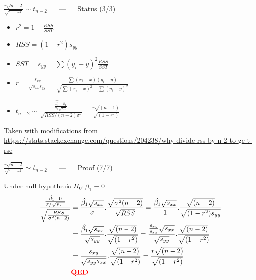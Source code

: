 \documentclass{beamer}
\begin{document}
\begin{frame}
{\centerline{$  \frac{r\sqrt{n-2}}{\sqrt{1-r^2}} \sim t_{n-2}  $  ~~ --- ~~ Status (3/3)}}

\begin{itemize}
\setlength\itemsep{0.8em}
\item $r^2 = 1 - \frac{RSS}{SST}$
\item $RSS = (1 - r^2)s_{yy} $
\item $SST = s_{yy} = \sum ( y_i - \bar{y} )^2 \frac{RSS}{SST}$
\item $r = \frac{s_{xy}}{\sqrt{s_{xx}s_{yy}}} = \frac{\sum (x_i - \bar{x})(y_i - \bar{y})}{\sqrt{\sum (x_i - \bar{x})^2 + \sum (y_i - \bar{y})^2}}$
\item $t_{n-2} \sim \frac{\frac{\hat{\beta_1} - \beta_1}{\sigma / \sqrt{s_{xx}}}}{\sqrt{RSS / (n-2)\sigma^2}} = \frac{r\sqrt{(n-1)}}{\sqrt{(1 - r^2)}}$
\end{itemize}


\begin{center}
\tiny{Taken with modifications from \url{https://stats.stackexchange.com/questions/204238/why-divide-rss-by-n-2-to-ge t-rse}}
\end{center}
\end{frame}


\begin{frame}
{\centerline{$  \frac{r\sqrt{n-2}}{\sqrt{1-r^2}} \sim t_{n-2}  $  ~~ --- ~~ Proof (7/7)}}

Under null hypothesis $H_0 : \beta_1 = 0$
\begin{align*}\
\frac{\frac{\hat{\beta_1} - 0}{\sigma / \sqrt{s_{xx}}}}{\sqrt{\frac{RSS}{\sigma^2 (n - 2)}}} &= \frac{\hat{\beta_1} \sqrt{s_{xx}}}{\sigma} . \frac{\sqrt{\sigma^2 (n-2)}}{\sqrt{RSS}} = \frac{\hat{\beta_1} \sqrt{s_{xx}}}{1} . \frac{\sqrt{(n-2)}}{\sqrt{(1 - r^2)s_{yy}}} \\
& = \frac{\hat{\beta_1} \sqrt{s_{xx}}}{\sqrt{s_{yy}} } . \frac{\sqrt{(n-2)}}{\sqrt{(1 - r^2)}} = \frac{\frac{s_{xy}}{s_{xx}}\sqrt{s_{xx}}}{\sqrt{s_{yy}} } . \frac{\sqrt{(n-2)}}{\sqrt{(1 - r^2)}} \\
& =  \frac{s_{xy}}{\sqrt{s_{yy}s_{xx}} } . \frac{\sqrt{(n-2)}}{\sqrt{(1 - r^2)}} = \frac{r\sqrt{(n-2)}}{\sqrt{(1 - r^2)}} \\
& \textbf{\textcolor{red}{QED}}
\end{align*}


\end{frame}
\end{document}
